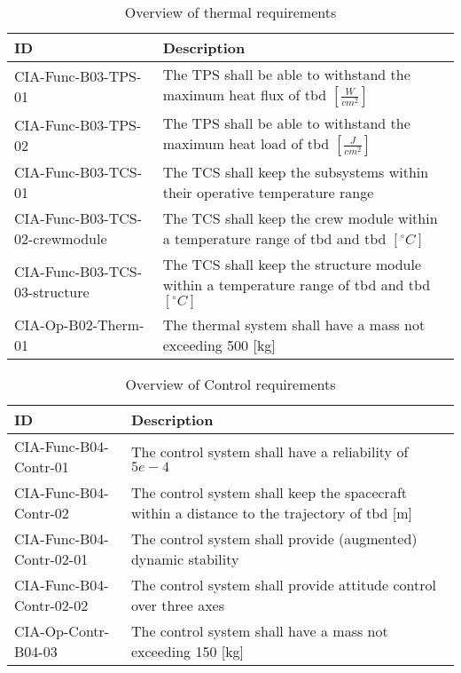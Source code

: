 \begin{table}[H]
	\caption*{Overview of thermal requirements}
	\begin{tabular}{|p{}|p{}|}
    \hline
    ID          & Description                                                                                                      \\ \hline \hline
   CIA-Func-B03-TPS-01 & The TPS shall be able to withstand the maximum heat flux of \gls{tbd} $ \left[\frac{W}{cm^2}\right] $               
\\ \hline
    CIA-Func-B03-TPS-02 &  The TPS shall be able to withstand the maximum heat load of \gls{tbd} $ \left[\frac{J}{cm^2}\right] $               
\\ \hline
    CIA-Func-B03-TCS-01 & The TCS shall keep the subsystems within their operative temperature range                                            
\\ \hline
    CIA-Func-B03-TCS-02-crewmodule & The TCS shall keep the crew module within a temperature range of \gls{tbd} and \gls{tbd} $ \left[^{\circ}C\right] $                                        
\\ \hline
    CIA-Func-B03-TCS-03-structure & The TCS shall keep the structure module within a temperature range of \gls{tbd} and \gls{tbd} $ \left[^{\circ}C\right] $                                        
\\ \hline
	CIA-Op-B02-Therm-01 	&	The thermal system shall have a mass not exceeding 500 [kg]  							\\ \hline
    \end{tabular}
    \label{tab:thermalreq}
\end{table}

\begin{table}[H]
	\caption*{Overview of Control requirements}
	\begin{tabular}{|p{}|p{}|}
		\hline
		ID         					&	Description																							\\ \hline \hline
		CIA-Func-B04-Contr-01		&	The control system shall have a reliability of $5e-4$            									\\ \hline
		CIA-Func-B04-Contr-02 		&	The control system shall keep the spacecraft within a distance to the trajectory of \gls{tbd} [m]	\\ \hline	
		CIA-Func-B04-Contr-02-01 	&	The control system shall provide (augmented) dynamic stability       								\\ \hline
		CIA-Func-B04-Contr-02-02 	&	The control system shall provide attitude control over three axes         							\\ \hline	
		CIA-Op-Contr-B04-03	&	The control system shall have a mass not exceeding 150 [kg]  							\\ \hline
	\end{tabular}
	\label{tab:controlreq}
\end{table}
